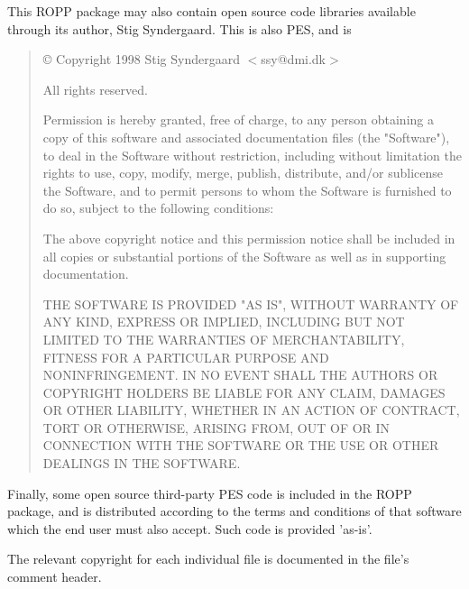 This ROPP package may also contain open source code libraries available 
through its author, Stig Syndergaard. This is also PES, and is
%
\begin{quote}
   \copyright{} Copyright 1998 Stig Syndergaard $<$ssy@dmi.dk$>$

     All rights reserved.

     Permission is hereby granted, free of charge, to any person obtaining
     a copy of this software and associated documentation files (the
     "Software"), to deal in the Software without restriction, including
     without limitation the rights to use, copy, modify, merge, publish,
     distribute, and/or sublicense the Software, and to permit persons 
     to whom the Software is furnished to do so, subject to
     the following conditions:

     The above copyright notice and this permission notice shall be
     included in all copies or substantial portions of the Software as well
     as in supporting documentation.

     THE SOFTWARE IS PROVIDED "AS IS", WITHOUT WARRANTY OF ANY KIND,
     EXPRESS OR IMPLIED, INCLUDING BUT NOT LIMITED TO THE WARRANTIES OF
     MERCHANTABILITY, FITNESS FOR A PARTICULAR PURPOSE AND
     NONINFRINGEMENT. IN NO EVENT SHALL THE AUTHORS OR COPYRIGHT HOLDERS BE
     LIABLE FOR ANY CLAIM, DAMAGES OR OTHER LIABILITY, WHETHER IN AN ACTION
     OF CONTRACT, TORT OR OTHERWISE, ARISING FROM, OUT OF OR IN CONNECTION
     WITH THE SOFTWARE OR THE USE OR OTHER DEALINGS IN THE SOFTWARE.
\end{quote}
%

Finally, some open source third-party PES code is included in the ROPP
package, and is distributed according to the terms and conditions of
that software which the end user must also accept. Such code is
provided 'as-is'.

The relevant copyright for each individual file is documented in the
file's comment header.


